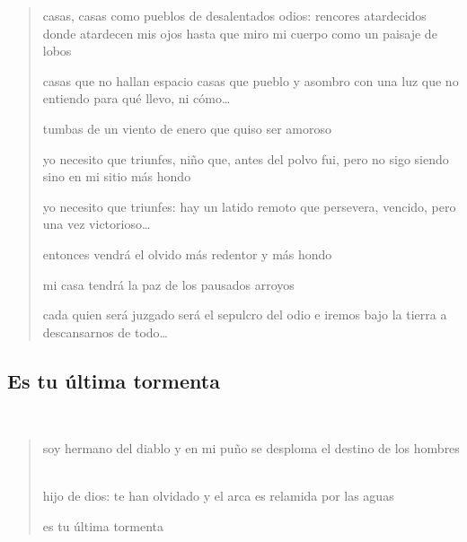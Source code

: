 \documentclass[a4paper, 12pt]{article}
\begin{document}
\begin{verse}

casas, casas como pueblos 
de desalentados odios:
rencores atardecidos
donde atardecen mis ojos
hasta que miro mi cuerpo
como un paisaje de lobos
~

casas que no hallan espacio
casas que pueblo y asombro 
con una luz que no entiendo 
para qué llevo, ni cómo\ldots
~

tumbas de un viento de enero 
que quiso ser amoroso
~

yo necesito que triunfes,
niño que, antes del polvo 
fui, pero no sigo siendo 
sino en mi sitio más hondo 
~

yo necesito que triunfes:
hay un latido remoto 
que persevera, vencido, 
pero una vez victorioso\ldots
~

entonces vendrá el olvido 
más redentor y más hondo 
~ 

mi casa tendrá la paz 
de los pausados arroyos
~

cada quien será juzgado
será el sepulcro del odio
e iremos bajo la tierra
a descansarnos de todo\ldots




\end{verse}

\pagebreak
\subsection{Es tu última tormenta}
~ 

\begin{verse}
    
soy hermano del diablo y en mi puño
se desploma el destino de los hombres
~

hijo de dios: te han olvidado
y el arca es relamida por las aguas
~

es tu última tormenta
\end{verse}

\pagebreak
\end{document}
